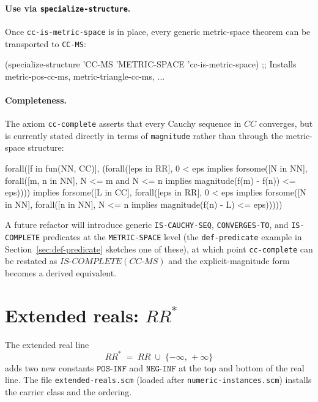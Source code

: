 \paragraph{Use via \texttt{specialize-structure}.}
Once \texttt{cc-is-metric-space} is in place, every generic
metric-space theorem can be transported to \texttt{CC-MS}:
\begin{VNBcode}
(specialize-structure 'CC-MS 'METRIC-SPACE 'cc-is-metric-space)
;; Installs metric-pos-cc-ms, metric-triangle-cc-ms, ...
\end{VNBcode}

\paragraph{Completeness.}
The axiom \texttt{cc-complete} asserts that every Cauchy sequence in
$\mathit{CC}$ converges, but is currently stated directly in terms of
\texttt{magnitude} rather than through the metric-space structure:
\begin{VNBsnip}
forall([f in fun(NN, CC)],
  (forall([eps in RR], 0 < eps implies
     forsome([N in NN], forall([m, n in NN], N <= m and N <= n implies
       magnitude(f(m) - f(n)) <= eps))))
  implies
  forsome([L in CC],
    forall([eps in RR], 0 < eps implies
      forsome([N in NN], forall([n in NN], N <= n implies
        magnitude(f(n) - L) <= eps)))))
\end{VNBsnip}
A future refactor will introduce generic \texttt{IS-CAUCHY-SEQ},
\texttt{CONVERGES-TO}, and \texttt{IS-COMPLETE} predicates at the
\texttt{METRIC-SPACE} level (the
\texttt{def-predicate} example in Section~\ref{sec:def-predicate}
sketches one of these), at which point \texttt{cc-complete} can be
restated as $\mathit{IS\text{-}COMPLETE}(\mathit{CC\text{-}MS})$ and the
explicit-magnitude form becomes a derived equivalent.

\section{Extended reals: $\mathit{RR}^{*}$}
\label{sec:extended-reals}

The extended real line
\[
   \mathit{RR}^{*} \;=\; \mathit{RR} \;\cup\; \{-\infty,\, +\infty\}
\]
adds two new constants $\mathtt{POS\text{-}INF}$ and
$\mathtt{NEG\text{-}INF}$ at the top and bottom of the real line.  The
file \texttt{extended-reals.scm} (loaded after \texttt{numeric-instances.scm})
installs the carrier class and the ordering.

